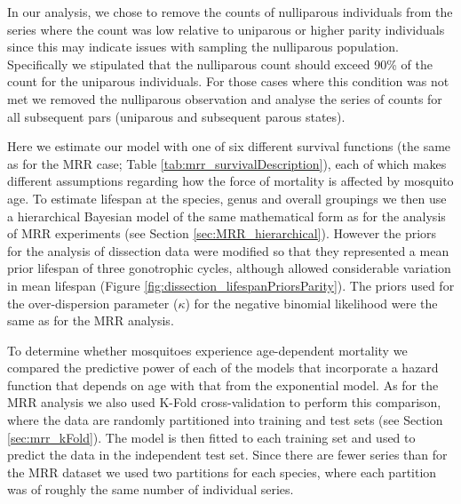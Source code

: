 \documentclass[12pt]{article}
\begin{document}
{In our analysis, we chose to remove the counts of nulliparous individuals from the series where the count was low relative to uniparous or higher parity individuals since this may indicate issues with sampling the nulliparous population. Specifically we stipulated that the nulliparous count should exceed 90\% of the count for the uniparous individuals. For those cases where this condition was not met we removed the nulliparous observation and analyse the series of counts for all subsequent pars (uniparous and subsequent parous states).

Here we estimate our model with one of six different survival functions (the same as for the MRR case; Table \ref{tab:mrr_survivalDescription}), each of which makes different assumptions regarding how the force of mortality is affected by mosquito age. To estimate lifespan at the species, genus and overall groupings we then use a hierarchical Bayesian model of the same mathematical form as for the analysis of MRR experiments (see Section \ref{sec:MRR_hierarchical}). However the priors for the analysis of dissection data were modified so that they represented a mean prior lifespan of three gonotrophic cycles, although allowed considerable variation in mean lifespan (Figure \ref{fig:dissection_lifespanPriorsParity}). The priors used for the over-dispersion parameter ($\kappa$) for the negative binomial likelihood were the same as for the MRR analysis.

To determine whether mosquitoes experience age-dependent mortality we compared the predictive power of each of the models that incorporate a hazard function that depends on age with that from the exponential model. As for the MRR analysis we also used K-Fold cross-validation to perform this comparison, where the data are randomly partitioned into training and test sets (see Section \ref{sec:mrr_kFold}). The model is then fitted to each training set and used to predict the data in the independent test set. Since there are fewer series than for the MRR dataset we used two partitions for each species, where each partition was of roughly the same number of individual series.

}
\end{document}
